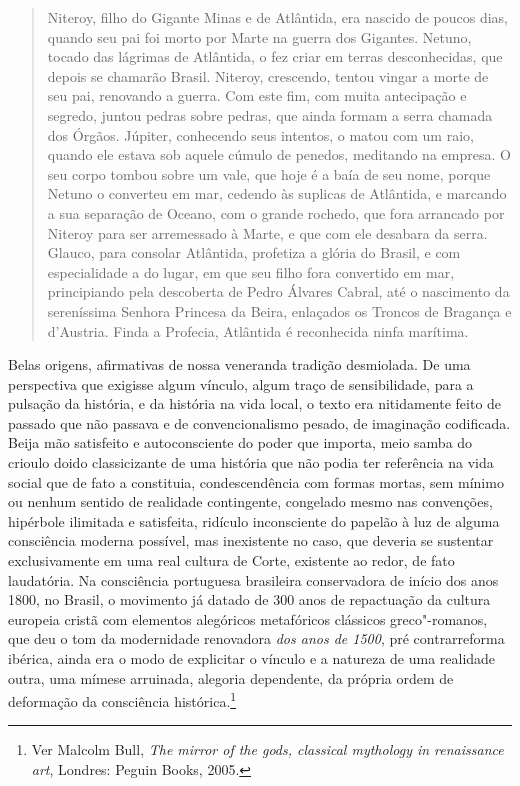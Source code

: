 \begin{quote}
Niteroy, filho do Gigante Minas e de Atlântida, era nascido de poucos
dias, quando seu pai foi morto por Marte na guerra dos Gigantes. Netuno,
tocado das lágrimas de Atlântida, o fez criar em terras desconhecidas,
que depois se chamarão Brasil. Niteroy, crescendo, tentou vingar a morte
de seu pai, renovando a guerra. Com este fim, com muita antecipação e
segredo, juntou pedras sobre pedras, que ainda formam a serra chamada
dos Órgãos. Júpiter, conhecendo seus intentos, o matou com um raio,
quando ele estava sob aquele cúmulo de penedos, meditando na empresa. O
seu corpo tombou sobre um vale, que hoje é a baía de seu nome, porque
Netuno o converteu em mar, cedendo às suplicas de Atlântida, e marcando
a sua separação de Oceano, com o grande rochedo, que fora arrancado por
Niteroy para ser arremessado à Marte, e que com ele desabara da serra.
Glauco, para consolar Atlântida, profetiza a glória do Brasil, e com
especialidade a do lugar, em que seu filho fora convertido em mar,
principiando pela descoberta de Pedro Álvares Cabral, até o nascimento
da sereníssima Senhora Princesa da Beira, enlaçados os Troncos de
Bragança e d'Austria. Finda a Profecia, Atlântida é reconhecida ninfa
marítima.
\end{quote}

Belas origens, afirmativas de nossa veneranda tradição desmiolada. De
uma perspectiva que exigisse algum vínculo, algum traço de
sensibilidade, para a pulsação da história, e da história na vida local,
o texto era nitidamente feito de passado que não passava e de
convencionalismo pesado, de imaginação codificada. Beija mão satisfeito
e autoconsciente do poder que importa, meio samba do crioulo doido
classicizante de uma história que não podia ter referência na vida
social que de fato a constituia, condescendência com formas mortas, sem
mínimo ou nenhum sentido de realidade contingente, congelado mesmo nas
convenções, hipérbole ilimitada e satisfeita, ridículo inconsciente do
papelão à luz de alguma consciência moderna possível, mas inexistente no
caso, que deveria se sustentar exclusivamente em uma real cultura de
Corte, existente ao redor, de fato laudatória. Na consciência portuguesa
brasileira conservadora de início dos anos 1800, no Brasil, o movimento
já datado de 300 anos de repactuação da cultura europeia cristã com
elementos alegóricos metafóricos clássicos greco"-romanos, que deu o tom
da modernidade renovadora \emph{dos anos de 1500}, pré contrarreforma
ibérica, ainda era o modo de explicitar o vínculo e a natureza de uma
realidade outra, uma mímese arruinada, alegoria dependente, da própria
ordem de deformação da consciência histórica.\footnote{Ver Malcolm Bull,
  \emph{The mirror of the gods, classical mythology in renaissance art},
  Londres: Peguin Books, 2005.}

